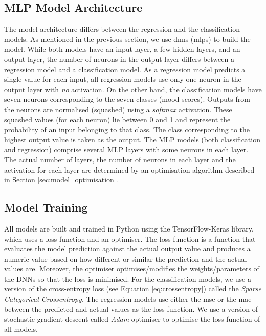 \subsection{MLP Model Architecture}
\label{sec:monolithic_model_architecture}
The model architecture differs between the regression and the classification models. As mentioned in the previous section, we use \glspl{dnn} (\glspl{mlp}) to build the model. While both models have an input layer, a few hidden layers, and an output layer, the number of neurons in the output layer differs between a regression model and a classification model. As a regression model predicts a single value for each input, all regression models use only one neuron in the output layer with \emph{no} activation. On the other hand, the classification models have seven neurons corresponding to the seven classes (mood scores). Outputs from the neurons are normalised (squashed) using a \emph{softmax} activation. These squashed values (for each neuron) lie between 0 and 1 and represent the probability of an input belonging to that class. The class corresponding to the highest output value is taken as the output. The MLP models (both classification and regression) comprise several MLP layers with some neurons in each layer. The actual number of layers, the number of neurons in each layer and the activation for each layer are determined by an optimisation algorithm described in Section \ref{sec:model_optimisation}.




\subsection{Model Training}
\label{sec:monolithic_model_training}
All models are built and trained in Python using the TensorFlow-Keras library, which uses a loss function and an optimiser. The loss function is a function that evaluates the model prediction against the actual output value and produces a numeric value based on how different or similar the prediction and the actual values are. Moreover, the optimiser optimises/modifies the weights/parameters of the DNNs so that the loss is minimised. For the classification models, we use a version of the cross-entropy loss (see Equation \ref{eq:crossentropy}) called the \emph{Sparse Categorical Crossentropy}. The regression models use either the \gls{mse} or the \gls{mae} between the predicted and actual values as the loss function. We use a version of stochastic gradient descent called \emph{Adam} optimiser to optimise the loss function of all models. 



